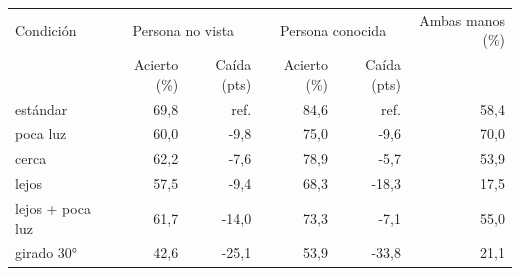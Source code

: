 \begin{tabular}{lrrrrr}
\toprule
Condición & \multicolumn{2}{c}{Persona no vista} & \multicolumn{2}{c}{Persona conocida} & Ambas manos (\%) \\
 & Acierto (\%) & Caída (pts) & Acierto (\%) & Caída (pts) & \\
\midrule
estándar & 69,8 & ref. & 84,6 & ref. & 58,4 \\
poca luz & 60,0 & -9,8 & 75,0 & -9,6 & 70,0 \\
cerca & 62,2 & -7,6 & 78,9 & -5,7 & 53,9 \\
lejos & 57,5 & -9,4 & 68,3 & -18,3 & 17,5 \\
lejos + poca luz & 61,7 & -14,0 & 73,3 & -7,1 & 55,0 \\
girado 30° & 42,6 & -25,1 & 53,9 & -33,8 & 21,1 \\
\bottomrule
\end{tabular}
